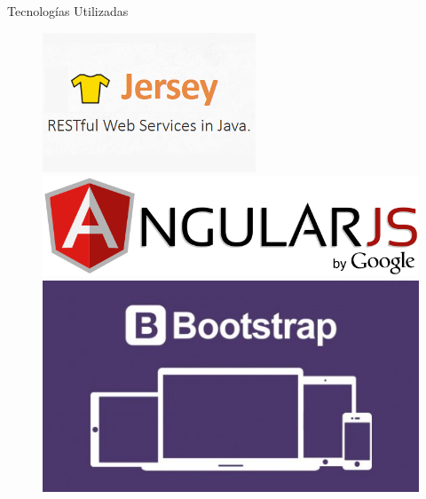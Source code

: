 \documentclass{beamer}
\begin{document}
\begin{frame}{Tecnologías Utilizadas}
                \begin{figure}
                    \centering
                    \begin{minipage}{0.25\textwidth}
                        \includegraphics[width=\textwidth]{res/logo-jersey}
                    \end{minipage}
                    \begin{minipage}{0.25\textwidth}
                        \includegraphics[width=\textwidth]{res/logo-angular}
                    \end{minipage}
                    \begin{minipage}{0.25\textwidth}
                        \includegraphics[width=\textwidth]{res/logo-bootstrap}

\end{minipage}
\end{figure}
\end{frame}
\end{document}
